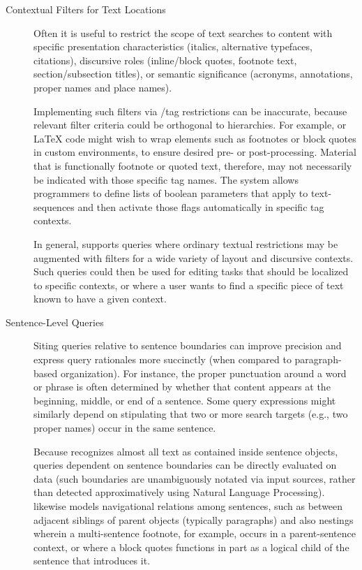 \documentclass[11pt]{article}
\begin{document}
{{\begin{description}
\item[Contextual Filters for Text Locations]  Often it is 
useful to restrict the scope of text searches to 
content with specific presentation characteristics (italics, alternative 
typefaces, citations), discursive roles (inline/block quotes, 
footnote text, section/subsection titles), or semantic 
significance (acronyms, annotations, proper names and place names).  

\pseudoIndent{} Implementing such filters via \XPath{}/tag 
restrictions can be inaccurate, because relevant filter 
criteria could be orthogonal to \DOM{} hierarchies.  For 
example, \XML{} or \LaTeX{} code might wish to wrap 
elements such as footnotes or block quotes in 
custom environments, to ensure desired pre- or 
post-processing.  Material that is functionally 
footnote or quoted text, therefore, may not necessarily 
be indicated with those specific tag names.  The \PacTk{} 
system allows programmers to define lists of boolean 
parameters that apply to text-sequences and then 
activate those flags automatically in specific tag contexts.



\pseudoIndent{} In general, \PacTk{} supports queries where ordinary 
textual restrictions may be augmented with filters 
for a wide variety of layout and discursive contexts.  
Such queries could then be used for editing 
tasks that should be localized to specific contexts, 
or where a user wants to find a specific piece of 
text known to have a given context.\clearpage{}

\item[Sentence-Level Queries]  Siting queries relative 
to sentence boundaries can improve 
precision and express query rationales more succinctly 
(when compared to paragraph-based organization).
For instance, the proper punctuation around a word or 
phrase is often determined by whether that content appears 
at the beginning, middle, or end of a sentence.  
Some query expressions might similarly depend on 
stipulating that two or more search targets 
(e.g., two proper names) occur in the same sentence.

\pseudoIndent{} Because \PacTk{} recognizes almost all text as 
contained inside sentence objects, queries dependent 
on sentence boundaries can be directly 
evaluated on \TSOM{} data (such boundaries are 
unambiguously notated via input sources, rather 
than detected approximatively using Natural Language 
Processing).  \lPacTk{} likewise models 
 navigational 
relations among sentences, such as between 
adjacent siblings of parent objects (typically 
paragraphs) and also nestings wherein a multi-sentence 
footnote, for example, occurs in a parent-sentence 
context, or where a block quotes functions in part as a 
logical child of the sentence that introduces it.


\end{description}}}
\end{document}
